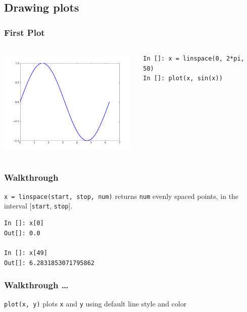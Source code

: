 \documentclass[14pt,compress]{beamer}
\newcounter{time}
\newcommand{\inctime}[1]{\addtocounter{time}{#1}{\tiny \thetime\ m}}
\newcommand{\typ}[1]{\lstinline{#1}}
\begin{document}
\subsection{Drawing plots}
\begin{frame}[fragile]
\frametitle{First Plot}
\begin{columns}
    \hspace*{-0.25in}
  \includegraphics[height=2in, interpolate=true]{data/firstplot}
    \begin{block}{}
    \begin{small}
\begin{lstlisting}
In []: x = linspace(0, 2*pi, 50)
In []: plot(x, sin(x))
\end{lstlisting}
    \end{small}
    \end{block}
\end{columns}
\end{frame}

\begin{frame}[fragile]
\frametitle{Walkthrough}
\begin{block}{\typ{x = linspace(start, stop, num)} }
returns \typ{num} evenly spaced points, in the interval [\typ{start}, \typ{stop}].
\end{block}
\vspace*{.35in}
\begin{block}{}
  \small
\begin{lstlisting}
In []: x[0]
Out[]: 0.0

In []: x[49]
Out[]: 6.2831853071795862
\end{lstlisting}
\end{block}
\end{frame}

\begin{frame}[fragile]
\frametitle{Walkthrough \ldots}
\begin{block}{\typ{plot(x, y)}}
plots \typ{x} and \typ{y} using default line style and color
\end{block}
\inctime{5}
\end{frame}
\end{document}
